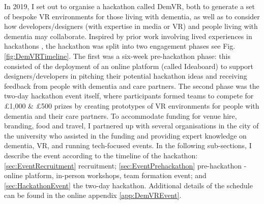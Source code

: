 In 2019, I set out to organise a hackathon called DemVR, both to generate a set of bespoke VR environments for those living with dementia, as well as to consider how developers/designers (with expertise in media or VR) and people living with dementia may collaborate. Inspired by prior work involving lived experiences in hackathons \citep{birbeck_self_2017}, the hackathon was split into two engagement phases see Fig.\ref{fig:DemVRTimeline}. The first was a six-week pre-hackathon phase: this consisted of the deployment of an online platform (called Ideaboard) to support designers/developers in pitching their potential hackathon ideas and receiving feedback from people with dementia and care partners. The second phase was the two-day hackathon event itself, where participants formed teams to compete for £1,000 \& £500 prizes by creating prototypes of VR environments for people with dementia and their care partners. To accommodate funding for venue hire, branding, food and travel, I partnered up with several organisations in the city of the university who assisted in the funding and providing expert knowledge on dementia, VR, and running tech-focused events. In the following sub-sections, I describe the event according to the timeline of the hackathon: \ref{sec:EventRecruitment} recruitment; \ref{sec:EventPrehackathon} pre-hackathon - online platform, in-person workshops, team formation event; and \ref{sec:HackathonEvent} the two-day hackathon. Additional details of the schedule can be found in the online appendix \ref{app:DemVREvent}.

